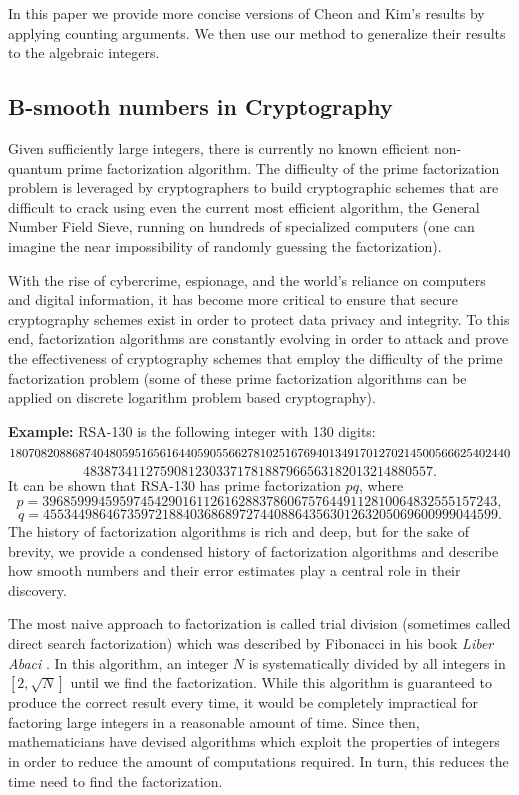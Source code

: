\documentclass[12pt]{amsart}
\theoremstyle{definition}
\begin{document}
In this paper we provide more concise versions of Cheon and Kim's results by applying counting arguments. We then use our method to generalize their results to the algebraic integers. 

\subsection{B-smooth numbers in Cryptography}
Given sufficiently large integers, there is currently no known efficient non-quantum prime factorization algorithm.
The difficulty of the prime factorization problem is leveraged by cryptographers to build cryptographic schemes that are difficult to crack using even the current most efficient algorithm, the General Number Field Sieve, running on hundreds of specialized computers (one can imagine the near impossibility of randomly guessing the factorization). 

With the rise of cybercrime, espionage, and the world's reliance on computers and digital information, it has become more critical to ensure that secure cryptography schemes exist in order to protect data privacy and integrity. To this end, factorization algorithms are constantly evolving in order to attack and prove the effectiveness of cryptography schemes that employ the difficulty of the prime factorization problem (some of these prime factorization algorithms can be applied on discrete logarithm problem based cryptography).

\noindent\textbf{Example:} RSA-130 is the following integer with 130 digits:
$$18070820886874048059516561644059055662781025167694013491701270214500566625402440\\$$
\vspace{-.7 in}
$$48387341127590812303371781887966563182013214880557.$$
\noindent It can be shown that RSA-130 has prime factorization $pq$, where
$$p = 39685999459597454290161126162883786067576449112810064832555157243,$$
\vspace{-.7 in}
$$q = 45534498646735972188403686897274408864356301263205069600999044599.$$
The history of factorization algorithms is rich and deep, but for the sake of brevity, we provide a condensed history of factorization algorithms and describe how smooth numbers and their error estimates play a central role in their discovery.

The most naive approach to factorization is called trial division (sometimes called direct search factorization) which was described by Fibonacci in his book \textit{Liber Abaci} \cite{Mollin}. In this algorithm, an integer $N$ is systematically divided by all integers in $[2, \sqrt{N}]$ until we find the factorization. While this algorithm is guaranteed to produce the correct result every time, it would be completely impractical for factoring large integers in a reasonable amount of time. Since then, mathematicians have devised algorithms which exploit the properties of integers in order to reduce the amount of computations required. In turn, this reduces the time need to find the factorization.
\end{document}
